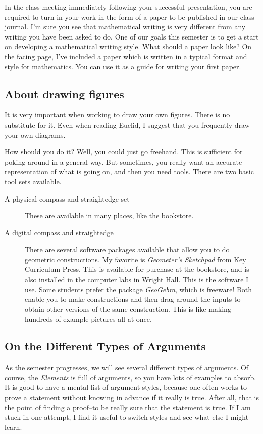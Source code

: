 \documentclass{tufte-handout}
\theoremstyle{definition}
\begin{document}
In the class meeting immediately following your successful presentation, you are required to turn in your work in the form of a paper to be published in our class journal. I'm sure you see that mathematical writing is very different from any writing you have been asked to do. One of our goals this semester is to get a start on developing a mathematical writing style. What should a paper look like? On the facing page, I've included a paper which is written in a typical format and style for mathematics. You can use it as a guide for writing your first paper.

\subsection*{About drawing figures} It is very important when working to draw your own figures. There is no substitute for it. Even when reading Euclid, I suggest that you frequently draw your own diagrams.

How should you do it? Well, you could just go freehand. This is sufficient for poking around in a general way. But sometimes, you really want an accurate representation of what is going on, and then you need tools. There are two basic tool sets available. 
\begin{description}
\item[A physical compass and straightedge set] These are available in many places, like the bookstore.
\item[A digital compass and straightedge] There are several software packages available that allow you to do geometric constructions. My favorite is \emph{Geometer's Sketchpad} from Key Curriculum Press. This is available for purchase at the bookstore, and is also installed in the computer labs in Wright Hall. This is the software I use. 
Some students prefer the package \emph{GeoGebra}, which is freeware! Both enable you to make constructions and then drag around the inputs to obtain other versions of the same construction. This is like making hundreds of example pictures all at once.
\end{description}

\subsection*{On the Different Types of Arguments}
As the semester progresses, we will see several different types of arguments. Of course, the \emph{Elements} is full of arguments, so you have lots of examples to absorb.  It is good to have a mental list of argument styles, because one often works to prove a statement without knowing in advance if it really is true. After all, that is the point of finding a proof--to be really sure that the statement is true. If I am stuck in one attempt, I find it useful to switch styles and see what else I might learn.
\end{document}
